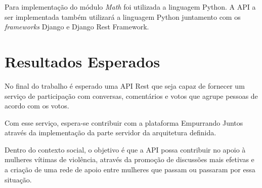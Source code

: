 Para implementação do módulo \textit{Math} foi utilizada a linguagem Python. A API a ser implementada também utilizará a linguagem Python
juntamento com os \textit{frameworks} Django e Django Rest Framework.

\section{Resultados Esperados}

No final do trabalho é esperado uma API Rest que seja capaz de fornecer um serviço de participação com conversas, comentários
e votos que agrupe pessoas de acordo com os votos.

Com esse serviço, espera-se contribuir com a plataforma Empurrando Juntos através da implementação da parte servidor da 
arquitetura definida.

Dentro do contexto social, o objetivo é que a API possa contribuir no apoio à mulheres vítimas de violência, através
da promoção de discussões mais efetivas e a criação de uma rede de apoio entre mulheres que passam ou passaram por essa situação.









